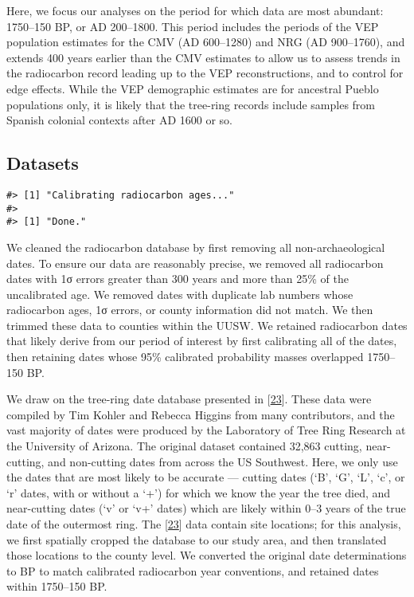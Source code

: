 \documentclass[
]{sa}
\begin{document}
Here, we focus our analyses on the period for which data are most abundant: 1750--150 BP, or AD 200--1800. This period includes the periods of the VEP population estimates for the CMV (AD 600--1280) and NRG (AD 900--1760), and extends 400 years earlier than the CMV estimates to allow us to assess trends in the radiocarbon record leading up to the VEP reconstructions, and to control for edge effects. While the VEP demographic estimates are for ancestral Pueblo populations only, it is likely that the tree-ring records include samples from Spanish colonial contexts after AD 1600 or so.

\hypertarget{datasets}{%
\subsection*{Datasets}\label{datasets}}

\begin{verbatim}
#> [1] "Calibrating radiocarbon ages..."
#> 
#> [1] "Done."
\end{verbatim}

We cleaned the radiocarbon database by first removing all non-archaeological dates. To ensure our data are reasonably precise, we removed all radiocarbon dates with 1σ errors greater than 300 years and more than 25\% of the uncalibrated age. We removed dates with duplicate lab numbers whose radiocarbon ages, 1σ errors, or county information did not match. We then trimmed these data to counties within the UUSW. We retained radiocarbon dates that likely derive from our period of interest by first calibrating all of the dates, then retaining dates whose 95\% calibrated probability masses overlapped 1750--150 BP.

We draw on the tree-ring date database presented in {[}\protect\hyperlink{ref-Bocinsky2016}{23}{]}. These data were compiled by Tim Kohler and Rebecca Higgins from many contributors, and the vast majority of dates were produced by the Laboratory of Tree Ring Research at the University of Arizona. The original dataset contained 32,863 cutting, near-cutting, and non-cutting dates from across the US Southwest. Here, we only use the dates that are most likely to be accurate --- cutting dates (`B', `G', `L', `c', or `r' dates, with or without a `+') for which we know the year the tree died, and near-cutting dates (`v' or `v+' dates) which are likely within 0--3 years of the true date of the outermost ring. The {[}\protect\hyperlink{ref-Bocinsky2016}{23}{]} data contain site locations; for this analysis, we first spatially cropped the database to our study area, and then translated those locations to the county level. We converted the original date determinations to BP to match calibrated radiocarbon year conventions, and retained dates within 1750--150 BP.
\end{document}
